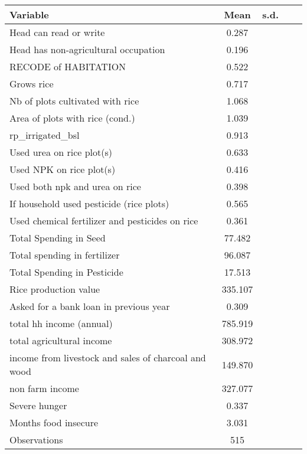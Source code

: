 \begin{tabular}{lcccc}\hline Variable & Mean & s.d.\\
\hline
Head can read or write&       0.287\\
Head has non-agricultural occupation&       0.196\\
RECODE of HABITATION&       0.522\\
Grows rice          &       0.717\\
Nb of plots cultivated with rice&       1.068\\
Area of plots with rice (cond.)&       1.039\\
rp\_irrigated\_bsl    &       0.913\\
Used urea on rice plot(s)&       0.633\\
Used NPK on rice plot(s)&       0.416\\
Used both npk and urea on rice&       0.398\\
If household used pesticide (rice plots)&       0.565\\
Used chemical fertilizer and pesticides on rice&       0.361\\
Total Spending in Seed&      77.482\\
Total spending in fertilizer&      96.087\\
Total Spending in Pesticide&      17.513\\
Rice production value&     335.107\\
Asked for a bank loan in previous year&       0.309\\
total hh income (annual)&     785.919\\
total agricultural income&     308.972\\
income from livestock and sales of charcoal and wood&     149.870\\
non farm income     &     327.077\\
Severe hunger       &       0.337\\
Months food insecure&       3.031\\
\hline
Observations        &         515\\
\hline\hline
\end{tabular}
